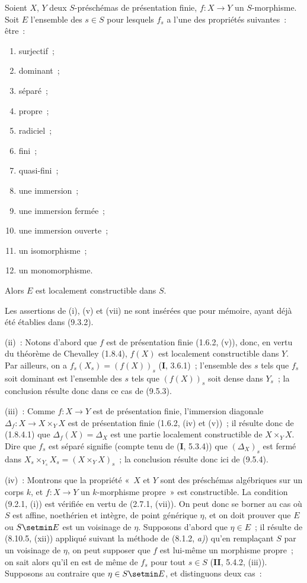 \begin{proposition}[9.6.1]
\label{IV.9.6.1-fr}
Soient $X$, $Y$ deux $S$-préschémas de présentation finie, $f:X\to Y$ un
$S$-morphisme. Soit $E$ l'ensemble des $s\in S$ pour lesquels $f_s$ a l'une
des propriétés suivantes~: être~:
\begin{enumerate}[label=\textup{(\roman*)},widest=xii]
  \item surjectif~;
  \item dominant~;
  \item séparé~;
  \item propre~;
  \item radiciel~;
  \item fini~;
  \item quasi-fini~;
  \item une immersion~;
  \item une immersion fermée~;
  \item une immersion ouverte~;
  \item un isomorphisme~;
  \item un monomorphisme.
\end{enumerate}
Alors $E$ est localement constructible dans $S$.
\end{proposition}

Les assertions de (i), (v) et (vii) ne sont insérées que pour mémoire, ayant
déjà été établies dans (9.3.2).

(ii)~: Notons d'abord que $f$ est de présentation finie (1.6.2, (v)), donc, en
vertu du théorème de Chevalley (1.8.4), $f(X)$ est localement constructible dans
$Y$. Par ailleurs, on a $f_s(X_s)=(f(X))_s$ (\textbf{I}, 3.6.1)~; l'ensemble
des $s$ tels que $f_s$ soit dominant est l'ensemble des $s$ tels que
$(f(X))_s$ soit dense dans $Y_s$~; la conclusion résulte donc dans ce cas de
(9.5.3).

(iii)~: Comme $f:X\to Y$ est de présentation finie, l'immersion diagonale
$\Delta_f:X\to X\times_YX$ est de présentation finie (1.6.2, (iv) et (v))~; il
résulte donc de (1.8.4.1) que $\Delta_f(X)=\Delta_X$ est une partie localement
constructible de $X\times_YX$. Dire que $f_s$ est séparé signifie (compte tenu
de (\textbf{I}, 5.3.4)) que $(\Delta_X)_s$ est fermé dans
$X_s\times_{Y_s}X_s=(X\times_YX)_s$~; la conclusion résulte donc ici de
(9.5.4).

(iv)~: Montrons que la propriété «~$X$ et $Y$ sont des préschémas algébriques
sur un corps $k$, et $f:X\to Y$ un $k$-morphisme propre~» est constructible. La
condition (9.2.1, (i)) est vérifiée en vertu de (2.7.1, (vii)). On peut donc se
borner au cas où $S$ est affine, noethérien et intègre, de point générique
$\eta$, et on doit prouver que $E$ ou $S\setmin E$ est un voisinage de $\eta$.
Supposons d'abord que $\eta\in E$~; il résulte de (8.10.5, (xii)) appliqué
suivant la méthode de (8.1.2, \emph{a)}) qu'en remplaçant $S$ par un voisinage
de $\eta$, on peut
supposer que $f$ est lui-même un morphisme propre~; on sait alors qu'il en est
de même de $f_s$ pour tout $s\in S$ (\textbf{II}, 5.4.2, (iii)). Supposons au
contraire que $\eta\in S\setmin E$, et distinguons deux cas~:

